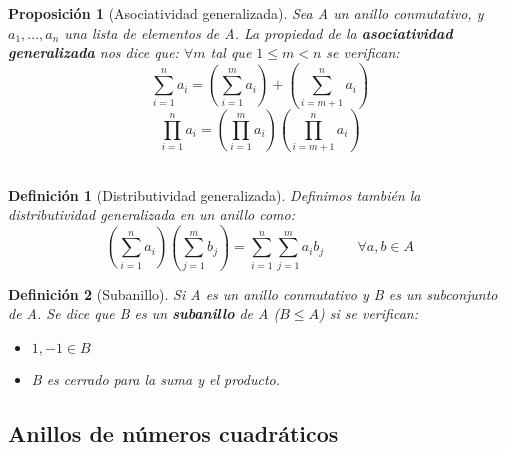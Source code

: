 \documentclass[11pt, a4paper, titlepage]{article}
\theoremstyle{theorem-style}
\newtheorem*{nprop}{Proposición}
\theoremstyle{definition-style}
\newtheorem*{ndef}{Definición}
\theoremstyle{remark-style}
\theoremstyle{example-style}
\begin{document}
\begin{nprop}[Asociatividad generalizada]
	Sea A un anillo conmutativo, y $a_1, ..., a_n$ una lista de elementos de A.
La propiedad de la \textbf{asociatividad generalizada} nos dice que:
$\forall m$ tal que $1 \leq m < n$ se verifican: \[\sum_{i=1}^{n}a_i = (\sum_{i=1}^{m}a_i) + (\sum_{i=m+1}^{n}a_i)\]\[\prod_{i=1}^{n}a_i = (\prod_{i=1}^{m}a_i)(\prod_{i=m+1}^{n}a_i)\]\\
\end{nprop}


\begin{ndef}[Distributividad generalizada]
Definimos también la distributividad generalizada en un anillo como:
	\[(\sum_{i=1}^{n} a_i)(\sum_{j=1}^{m}b_j) = \sum_{i=1}^{n}\sum_{j=1}^{m}a_i b_j \hspace{1cm} \forall a,b\in A\]
\end{ndef}

\begin{ndef}[Subanillo]

Si A es un anillo conmutativo y B es un subconjunto de A. Se dice que B es un \textbf{subanillo} de A ($B \leq A$) si se verifican:
\begin{itemize}
\item $1,-1 \in B$
\item B es cerrado para la suma y el producto.
\end{itemize}
	
\end{ndef}

\newpage 

\subsection*{Anillos de números cuadráticos}
\end{document}
